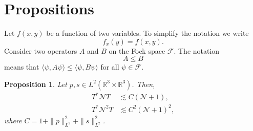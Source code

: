 \documentclass[a4paper,11pt]{article}
\newtheorem{prop}{Proposition}
\newcommand{\R}{\mathds{R}}
\newcommand{\N}{\mathcal{N}}
\begin{document}
\section{Propositions}


Let $f(x,y)$ be a function of two variables. To simplify the notation we write
\begin{displaymath}
  f_x(y) = f(x,y).
\end{displaymath}
Consider two operators $A$ and $B$ on the Fock space $\mathcal{F}$. The
notation
\begin{displaymath}
  A \le B
\end{displaymath}
means that $\langle \psi, A \psi \rangle \le \langle \psi, B \psi \rangle$ for
all $\psi \in \mathcal{F}$.


\begin{prop}
  Let $p, s \in L^2(\R^3 \times \R^3)$. Then,
  \label{p:TNT}
  \begin{align}
    T^* \N T & \apprle C (\N+1), \label{TNT} \tag{i} \\
    T^* \N^2 T & \apprle C^2 (\N+1)^2, \label{TN2T} \tag{ii}
  \end{align}
  where $C = 1 + \| p \|_{L^2}^2 + \| s \|_{L^2}^2$.
\end{prop}
\end{document}
